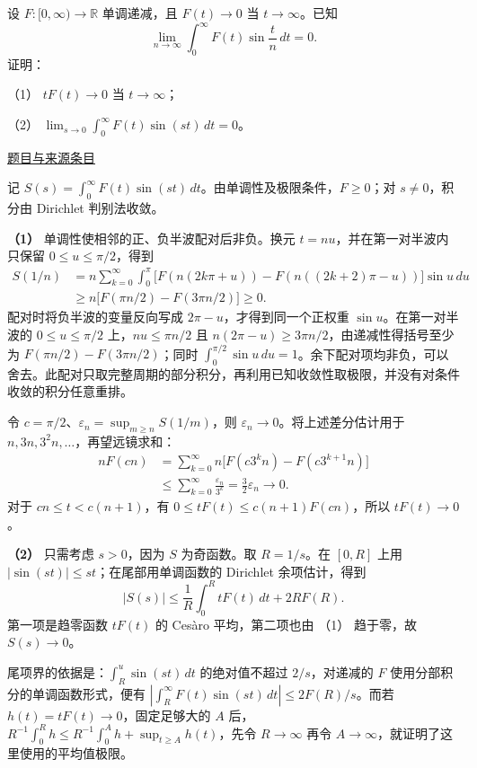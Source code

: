 \documentclass[UTF8,12pt,a4paper,fontset=fandol]{ctexart}
\begin{document}
\begin{example}[来源序号7]\label{ex:pre03-math:7}\label{pr:pre03-math:7}

设 $F:[0,\infty)\to\mathbb R$ 单调递减，且 $F(t)\to0$ 当 $t\to\infty$。已知
\[
\lim_{n\to\infty}\int_0^\infty F(t)\sin\frac tn\,dt=0.
\]
证明：

（1） $tF(t)\to0$ 当 $t\to\infty$；

（2） $\displaystyle\lim_{s\to0}\int_0^\infty F(t)\sin(st)\,dt=0$。

\par\href{https://github.com/lzxcr/cmc-mathematics/blob/64916fa1fdbc3e444a652eca204d5669058ee321/src/problems/preliminary/03/07.md}{题目与来源条目}

\end{example}

\begin{solve}\label{ans:pre03-math:7}

记 $S(s)=\int_0^\infty F(t)\sin(st)\,dt$。由单调性及极限条件，$F\ge0$；对 $s\ne0$，积分由 Dirichlet 判别法收敛。

\textbf{（1）} 单调性使相邻的正、负半波配对后非负。换元 $t=nu$，并在第一对半波内只保留 $0\le u\le\pi/2$，得到
\[
\begin{aligned}
S(1/n)
&=n\sum_{k=0}^\infty\int_0^\pi
\bigl[F(n(2k\pi+u))-F(n((2k+2)\pi-u))\bigr]\sin u\,du\\
&\ge n\bigl[F(\pi n/2)-F(3\pi n/2)\bigr]\ge0.
\end{aligned}
\]
配对时将负半波的变量反向写成 $2\pi-u$，才得到同一个正权重 $\sin u$。在第一对半波的 $0\le u\le\pi/2$ 上，$nu\le\pi n/2$ 且 $n(2\pi-u)\ge3\pi n/2$，由递减性得括号至少为 $F(\pi n/2)-F(3\pi n/2)$；同时 $\int_0^{\pi/2}\sin u\,du=1$。余下配对项均非负，可以舍去。此配对只取完整周期的部分积分，再利用已知收敛性取极限，并没有对条件收敛的积分任意重排。

令 $c=\pi/2$、$\varepsilon_n=\sup_{m\ge n}S(1/m)$，则 $\varepsilon_n\to0$。将上述差分估计用于 $n,3n,3^2n,\ldots$，再望远镜求和：
\[
\begin{aligned}
nF(cn)
&=\sum_{k=0}^\infty n\bigl[F(c3^kn)-F(c3^{k+1}n)\bigr]\\
&\le\sum_{k=0}^\infty\frac{\varepsilon_n}{3^k}
=\frac32\varepsilon_n\longrightarrow0.
\end{aligned}
\]
对于 $cn\le t<c(n+1)$，有 $0\le tF(t)\le c(n+1)F(cn)$，所以 $tF(t)\to0$。

\textbf{（2）} 只需考虑 $s>0$，因为 $S$ 为奇函数。取 $R=1/s$。在 $[0,R]$ 上用 $|\sin(st)|\le st$；在尾部用单调函数的 Dirichlet 余项估计，得到
\[
|S(s)|\le\frac1R\int_0^R tF(t)\,dt+2RF(R).
\]
第一项是趋零函数 $tF(t)$ 的 Cesàro 平均，第二项也由 （1） 趋于零，故 $S(s)\to0$。

尾项界的依据是：$\int_R^u\sin(st)\,dt$ 的绝对值不超过 $2/s$，对递减的 $F$ 使用分部积分的单调函数形式，便有 $|\int_R^\infty F(t)\sin(st)\,dt|\le2F(R)/s$。而若 $h(t)=tF(t)\to0$，固定足够大的 $A$ 后，$R^{-1}\int_0^Rh\le R^{-1}\int_0^A h+\sup_{t\ge A}h(t)$，先令 $R\to\infty$ 再令 $A\to\infty$，就证明了这里使用的平均值极限。

\end{solve}
\end{document}
